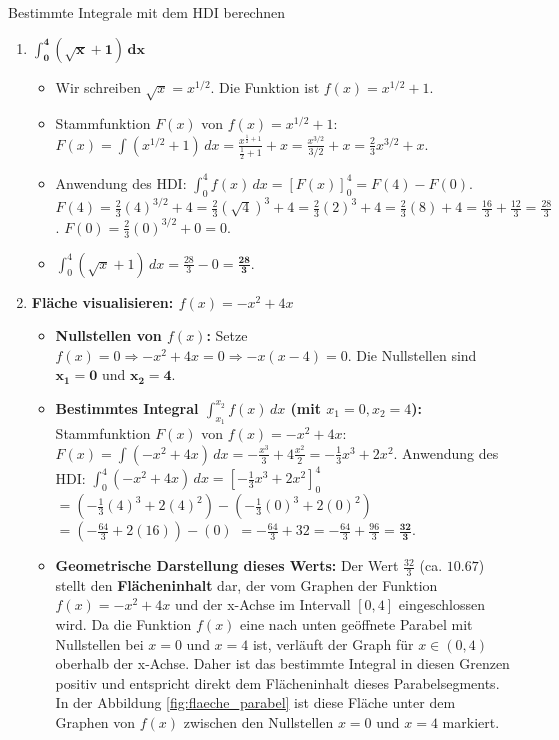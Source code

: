 \begin{loesungsumgebung}{Bestimmte Integrale mit dem HDI berechnen}
\begin{enumerate}[label=(\alph*)]
    \item $\mathbf{\int_{0}^{4} (\sqrt{x} + 1) \,dx}$
    \begin{itemize}
        \item Wir schreiben $\sqrt{x} = x^{1/2}$. Die Funktion ist $f(x) = x^{1/2} + 1$.
        \item Stammfunktion $F(x)$ von $f(x) = x^{1/2} + 1$:
        $F(x) = \int (x^{1/2} + 1) \,dx = \frac{x^{\frac{1}{2}+1}}{\frac{1}{2}+1} + x = \frac{x^{3/2}}{3/2} + x = \frac{2}{3}x^{3/2} + x$.
        \item Anwendung des HDI: $\int_{0}^{4} f(x) \,dx = [F(x)]_{0}^{4} = F(4) - F(0)$.
        $F(4) = \frac{2}{3}(4)^{3/2} + 4 = \frac{2}{3}(\sqrt{4})^3 + 4 = \frac{2}{3}(2)^3 + 4 = \frac{2}{3}(8) + 4 = \frac{16}{3} + \frac{12}{3} = \frac{28}{3}$.
        $F(0) = \frac{2}{3}(0)^{3/2} + 0 = 0$.
        \item $\int_{0}^{4} (\sqrt{x} + 1) \,dx = \frac{28}{3} - 0 = \mathbf{\frac{28}{3}}$.
    \end{itemize}

    \item \textbf{Fläche visualisieren: $f(x) = -x^2 + 4x$}
    \begin{itemize}
        \item \textbf{Nullstellen von $f(x)$:}
        Setze $f(x)=0 \Rightarrow -x^2 + 4x = 0 \Rightarrow -x(x-4) = 0$.
        Die Nullstellen sind $\mathbf{x_1 = 0}$ und $\mathbf{x_2 = 4}$.
        \item \textbf{Bestimmtes Integral $\int_{x_1}^{x_2} f(x) \,dx$ (mit $x_1=0, x_2=4$):}
        Stammfunktion $F(x)$ von $f(x) = -x^2 + 4x$:
        $F(x) = \int (-x^2 + 4x) \,dx = -\frac{x^3}{3} + 4\frac{x^2}{2} = -\frac{1}{3}x^3 + 2x^2$.
        Anwendung des HDI:
        $\int_{0}^{4} (-x^2 + 4x) \,dx = [-\frac{1}{3}x^3 + 2x^2]_{0}^{4}$
        $= \left(-\frac{1}{3}(4)^3 + 2(4)^2\right) - \left(-\frac{1}{3}(0)^3 + 2(0)^2\right)$
        $= \left(-\frac{64}{3} + 2(16)\right) - (0)$
        $= -\frac{64}{3} + 32 = -\frac{64}{3} + \frac{96}{3} = \mathbf{\frac{32}{3}}$.
        \item \textbf{Geometrische Darstellung dieses Werts:}
        Der Wert $\frac{32}{3}$ (ca. $10.67$) stellt den \textbf{Flächeninhalt} dar, der vom Graphen der Funktion $f(x)=-x^2+4x$ und der x-Achse im Intervall $[0,4]$ eingeschlossen wird.
        Da die Funktion $f(x)$ eine nach unten geöffnete Parabel mit Nullstellen bei $x=0$ und $x=4$ ist, verläuft der Graph für $x \in (0,4)$ oberhalb der x-Achse. Daher ist das bestimmte Integral in diesen Grenzen positiv und entspricht direkt dem Flächeninhalt dieses Parabelsegments.
        In der Abbildung \ref{fig:flaeche_parabel} ist diese Fläche unter dem Graphen von $f(x)$ zwischen den Nullstellen $x=0$ und $x=4$ markiert.
    \end{itemize}
\end{enumerate}

\end{loesungsumgebung}


